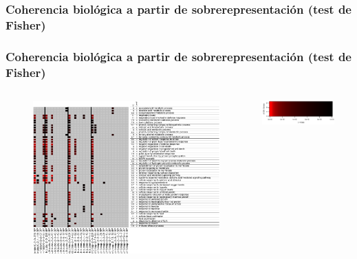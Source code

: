 \documentclass[serif,9pt, t]{beamer}
\begin{document}
\subsubsection*{Coherencia biológica a partir de sobrerepresentación (test de Fisher)}
\begin{frame}\frametitle{Coherencia biológica a partir de sobrerepresentación (test de Fisher)} 
\vspace{-40pt}
\begin{columns}
\column{\dimexpr\paperwidth-10pt}
\begin{figure}
\centering
\includegraphics[height=0.95\textheight, width=1\textwidth]{fisher_grupo_2-cropped.pdf}
\end{figure}
\vspace{-45pt}
\begin{columns}
	\includegraphics[width=0.8\textwidth]{fisher_grupo_2-solo-codigocolores.pdf}
\end{columns}	
\end{columns}
\end{frame}
\end{document}
